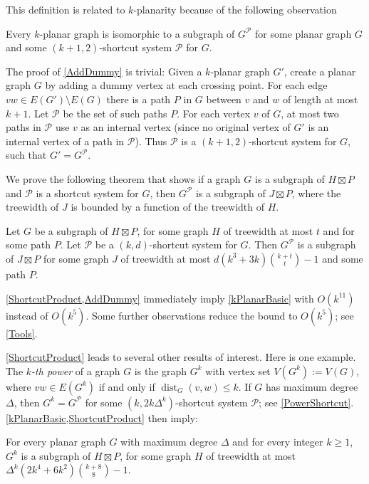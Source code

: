\documentclass{patmorin}
\DeclareMathOperator{\dist}{dist}
\newcommand{\PP}{\mathcal{P}}
\renewcommand{\geq}{\geqslant}
\renewcommand{\leq}{\leqslant}
\begin{document}
This definition is related to $k$-planarity because of the following observation 

\begin{obs}
\label{AddDummy}
Every $k$-planar graph is isomorphic to a subgraph of $G^\PP$ for some planar graph $G$ and some $(k+1,2)$-shortcut system $\PP$ for $G$. 
\end{obs}

The proof of \cref{AddDummy} is trivial: Given a $k$-planar graph $G'$, create a planar graph $G$ by adding a dummy vertex at each crossing point. For each edge $vw\in E(G')\setminus E(G)$ there is a path $P$ in $G$ between $v$ and $w$ of length at most $k+1$. Let $\PP$ be the set of such paths $P$. For each vertex $v$ of $G$, at most two paths in $\PP$ use $v$ as an internal vertex (since no original vertex of $G'$ is an internal vertex of a path in $\PP$). Thus $\PP$ is a $(k+1,2)$-shortcut system for $G$, such that $G'=G^\PP$. 

We prove the following theorem that shows if a graph $G$ is a subgraph of $H\boxtimes P$ and $\PP$ is a shortcut system for $G$, then $G^{\mathcal{P}}$ is a subgraph of $J\boxtimes P$, where the treewidth of $J$ is bounded by a function of the treewidth of $H$. 

\begin{thm}
\label{ShortcutProduct}
Let $G$ be a subgraph of $H\boxtimes P$, for some graph $H$ of treewidth at most $t$ and for some path $P$. 
Let $\PP$ be a $(k,d)$-shortcut system for $G$. Then $G^\PP$ is a subgraph of $J\boxtimes P$ for some graph $J$ of treewidth at most $d(k^3+3k)\binom{k+t}{t}-1$ and some path $P$. 
\end{thm}

\cref{ShortcutProduct,AddDummy} immediately imply \cref{kPlanarBasic} with $O(k^{11})$ instead of $O(k^5)$. Some further observations reduce the bound to $O(k^5)$; see \cref{Tools}. 

\cref{ShortcutProduct} leads to several other results of interest. Here is one example. The \emph{$k$-th power} of a graph $G$ is the graph $G^k$ with vertex set $V(G^k):=V(G)$, where $vw\in E(G^k)$ if and only if $\dist_G(v,w)\leq k$. If $G$ has maximum degree $\Delta$, then $G^k = G^\PP$ for some $(k,2k\Delta^{k})$-shortcut system $\PP$; see \cref{PowerShortcut}. \cref{kPlanarBasic,ShortcutProduct} then imply:

\begin{thm}
\label{kPowerBasic}
For every planar graph $G$ with maximum degree $\Delta$ and for every integer $k\geq 1$, $G^k$ is a subgraph of $H\boxtimes P$, for some graph $H$ of treewidth at most 
$\Delta^{k} (2k^4+6k^2)\binom{k+8}{8}-1$. 
\end{thm}
\end{document}
